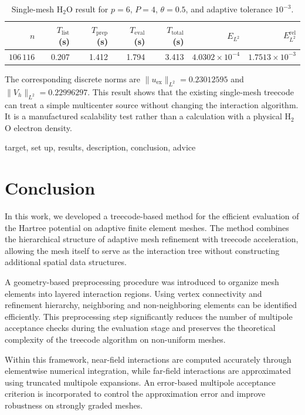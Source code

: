 \documentclass[a4paper,10pt]{article}
\begin{document}
\begin{table}[H]
\centering
\caption{Single-mesh H$_2$O result for \(p=6\), \(P=4\),
\(\theta=0.5\), and adaptive tolerance \(10^{-3}\).}
\label{tab:h2o_single_mesh_result}
\begin{tabular}{rrrrrrr}
\toprule
\(n\) & \(T_{\mathrm{list}}\) (s) & \(T_{\mathrm{prep}}\) (s) &
\(T_{\mathrm{eval}}\) (s) & \(T_{\mathrm{total}}\) (s) &
\(E_{L^2}\) & \(E_{L^2}^{\mathrm{rel}}\)\\
\midrule
\(106\,116\) & 0.207 & 1.412 & 1.794 & 3.413 &
\(4.0302\times10^{-4}\) & \(1.7513\times10^{-3}\)\\
\bottomrule
\end{tabular}
\end{table}

The corresponding discrete norms are
\(\|u_{\mathrm{ex}}\|_{L^2}=0.23012595\) and
\(\|V_h\|_{L^2}=0.22996297\).  This result shows that the existing
single-mesh treecode can treat a simple multicenter source without changing
the interaction algorithm.  It is a manufactured scalability test rather
than a calculation with a physical H$_2$O electron density.


{\color{red} target, set up, results, description, conclusion, advice}

\section{Conclusion}

In this work, we developed a treecode-based method for the efficient evaluation of the Hartree potential on adaptive finite element meshes. The method combines the hierarchical structure of adaptive mesh refinement with treecode acceleration, allowing the mesh itself to serve as the interaction tree without constructing additional spatial data structures.

A geometry-based preprocessing procedure was introduced to organize mesh elements into layered interaction regions. Using vertex connectivity and refinement hierarchy, neighboring and non-neighboring elements can be identified efficiently. This preprocessing step significantly reduces the number of multipole acceptance checks during the evaluation stage and preserves the theoretical complexity of the treecode algorithm on non-uniform meshes.

Within this framework, near-field interactions are computed accurately through elementwise numerical integration, while far-field interactions are approximated using truncated multipole expansions. An error-based multipole acceptance criterion is incorporated to control the approximation error and improve robustness on strongly graded meshes.
\end{document}
